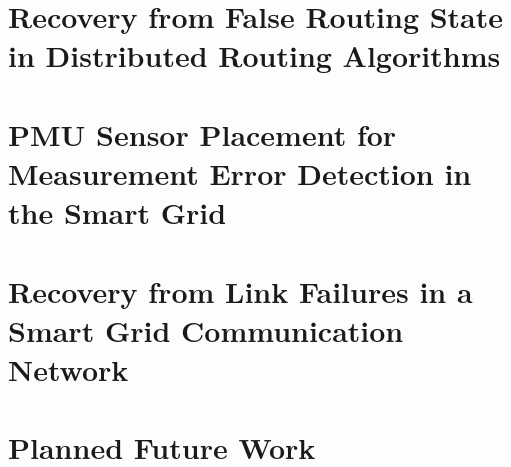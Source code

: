 \documentclass[proposal]{umthesis}          %
\begin{document}



\chapter{Recovery from False Routing State in Distributed Routing Algorithms}
\label{ch:rollback}






















\chapter{PMU Sensor Placement for Measurement Error Detection in the Smart Grid}
\label{ch:pmu-placement}








 








\chapter{Recovery from Link Failures in a Smart Grid Communication Network}
\label{ch:reliable-mcast}

%


\chapter{Planned Future Work}
\label{ch:conclusion}







\backmatter  %




\end{document}
